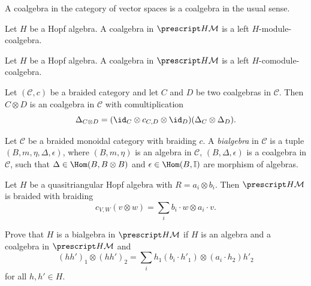 \begin{example}
A coalgebra in the category of vector spaces 
is a coalgebra in the usual sense.
\end{example}

\begin{example}
Let $H$ be a Hopf algebra. 
A coalgebra in $\lmod{H}$ is a left $H$-module-coalgebra.
\end{example}


\begin{example}
Let $H$ be a Hopf algebra. 
A coalgebra in $\lcomod{H}$ 
is a left $H$-comodule-coalgebra.
\end{example}

\begin{example}
Let $(\mathcal{C},c)$ be a braided category and let $C$ and $D$ be two
coalgebras in $\mathcal{C}$. Then $C\otimes D$ is an coalgebra in $\mathcal{C}$
with comultiplication 
\[
\Delta_{C\otimes D}=(\id_C\otimes c_{C,D}\otimes \id_D)(\Delta_C\otimes\Delta_D).
\]
\end{example}

\begin{definition}
Let $\mathcal{C}$ be a braided monoidal category with braiding $c$.
A \emph{bialgebra} in $\mathcal{C}$ is a tuple $(B,m,\eta,\Delta,\epsilon)$,
where $(B,m,\eta)$ is an algebra in $\mathcal{C}$, $(B,\Delta,\epsilon)$
is a coalgebra in $\mathcal{C}$, such that $\Delta\in\Hom(B,B\otimes B)$
and $\epsilon\in\Hom(B,\mathbb{I})$ are morphism of algebras.
\end{definition}


\begin{exercise}
Let $H$ be a quasitriangular Hopf algebra with $R=a_{i}\otimes b_{i}$.
Then $\lmod{H}$ is braided with braiding
\[
c_{V,W}(v\otimes w)=\sum_{i}b_{i}\cdot w\otimes a_{i}\cdot v.
\]
\end{exercise}

\begin{exercise}
    Prove that $H$ is a bialgebra in $\lmod{H}$ if $H$ is an algebra
and a coalgebra in $\lmod{H}$ and 
\[
(hh')_{1}\otimes(hh')_{2}=\sum_{i} h_{1}(b_{i}\cdot h'_{1})\otimes(a_{i}\cdot h_{2})h'_{2}
\]
for all $h,h'\in H$.
\end{exercise}

